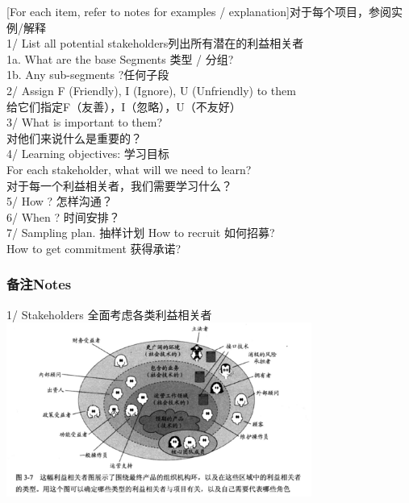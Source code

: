 {[}For each item, refer to notes for examples /
explanation{]}对于每个项目，参阅实例/解释\\
1/ List all potential stakeholders列出所有潜在的利益相关者\\
1a. What are the base Segments 类型 / 分组?\\
1b. Any sub-segments ?任何子段\\
2/ Assign F (Friendly), I (Ignore), U (Unfriendly) to them\\
给它们指定F（友善），I（忽略），U（不友好）\\
3/ What is important to them?\\
对他们来说什么是重要的？\\
4/ Learning objectives: 学习目标\\
For each stakeholder, what will we need to learn?\\
对于每一个利益相关者，我们需要学习什么？\\
5/ How ? 怎样沟通？\\
6/ When ? 时间安排？\\
7/ Sampling plan. 抽样计划 How to recruit 如何招募?\\
How to get commitment 获得承诺?\\


\hypertarget{ux6539ux8fdbux65b9ux6848}{%
\subsubsection{备注Notes}\label{ux6539ux8fdbux65b9ux6848}}

1/ Stakeholders 全面考虑各类利益相关者\\

\includegraphics[width=10cm]{7_利益相关者1.png}

